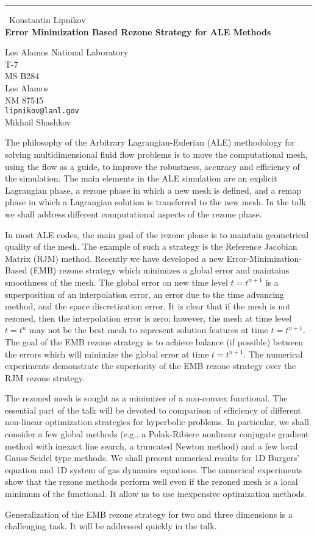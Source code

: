 \documentclass{report}
\begin{document}
\begin{center}
\rule{6in}{1pt} \
{\large Konstantin Lipnikov \\
{\bf Error Minimization Based Rezone Strategy for ALE Methods}}

Los Alamos National Laboratory \\ T-7 \\ MS B284 \\ Los Alamos \\ NM 87545
\\
{\tt lipnikov@lanl.gov}\\
Mikhail Shashkov\end{center}

The philosophy of the Arbitrary Lagrangian-Eulerian (ALE)
methodology for solving multidimensional fluid flow problems
is to move the computational mesh, using the flow as a guide,
to improve the robustness, accuracy and efficiency of the simulation. The
main elements in the ALE simulation are an
explicit Lagrangian phase, a rezone phase in which a new mesh
is defined, and a remap phase in which a Lagrangian solution
is transferred to the new mesh. In the talk we shall address
different computational aspects of the rezone phase.

In most ALE codes, the main goal of the rezone phase is to
maintain geometrical quality of the mesh. The example of such
a strategy is the Reference Jacobian Matrix (RJM) method.
Recently we have developed a new Error-Minimization-Based (EMB)
rezone strategy which minimizes a global error and maintains
smoothness of the mesh. The global error on new time level
$t=t^{n+1}$ is a superposition of an interpolation error, an
error due to the time advancing method, and the space
discretization error. It is clear that if the mesh is not rezoned,
then the interpolation error is zero; however, the mesh at time
level $t=t^n$ may not be the best mesh to represent solution features at
time $t=t^{n+1}$. The goal of the EMB rezone strategy is to achieve
balance (if possible) between the errors which will minimize the global
error at time $t=t^{n+1}$. The numerical experiments demonstrate the
superiority of the EMB rezone strategy over the RJM rezone strategy.

The rezoned mesh is sought as a minimizer of a non-convex functional. The
essential part of the talk will be devoted to comparison of efficiency of
different non-linear optimization strategies for hyperbolic problems. In
particular, we shall consider a few global methods (e.g., a Polak-Ribiere
nonlinear conjugate gradient method with inexact line search, a truncated
Newton method) and a few local Gauss-Seidel type methods. We shall
present numerical results for 1D Burgers' equation and 1D system of gas
dynamics equations. The numerical experiments show that the rezone
methods perform well even if the rezoned mesh is a local
minimum of the functional. It allow us to use inexpensive optimization methods.

Generalization of the EMB rezone strategy for two and three dimensions is
a challenging task. It will be addressed quickly in the talk.
\end{document}

